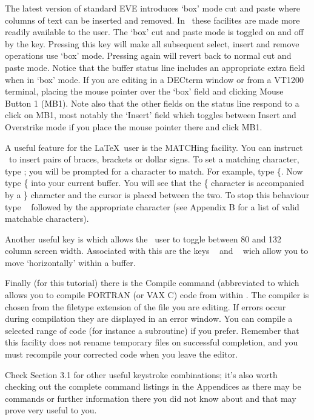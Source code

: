 The latest version of standard EVE introduces `box' mode cut and paste where
columns of text can be inserted and removed. In \STEve\ these facilites are
made more readily available to the user. The `box' cut and paste mode is
toggled on and off by the  key. Pressing this key will make all
subsequent select, insert and remove operations use `box' mode. Pressing
 again will revert back to normal cut and paste mode. Notice that
the buffer status line includes an appropriate extra field when in `box' mode.
If you are editing in a DECterm window or from a VT1200 terminal, placing the
mouse pointer over the `box' field and clicking Mouse Button 1 (MB1). Note also
that the other fields on the status line respond to a click on MB1, most
notably the `Insert' field which toggles between Insert and Overstrike mode if
you place the mouse pointer there and click MB1.

A useful feature for the \LaTeX\ user is the MATCHing facility. You can
instruct \STEve\ to insert pairs of braces, brackets or dollar signs. To set a
matching character, type ; you will be prompted for a character to
match. For example, type \{. Now type \{ into your current buffer. You will see
that the \{ character is accompanied by a \} character and the cursor is placed
between the two. To stop this behaviour type \gold\  followed by
the appropriate character (see Appendix B for a list of valid matchable
characters).

Another useful key is  which allows the \STEve\ user to toggle
between 80 and 132 column screen width. Associated with this are the keys
\gold\ \keyname{$\rhd$} and \gold\ \keyname{$\lhd$} wich allow you to move
`horizontally' within a buffer.

Finally (for this tutorial) there is the Compile command (abbreviated to 
  which allows you to compile FORTRAN (or VAX C) code
from within \STEve. The compiler is chosen from the filetype extension of the
file you are editing. If errors occur during compilation they are displayed in
an error window. You can compile a selected range of code (for instance a
subroutine) if you prefer. Remember that this facility does not rename
temporary files on successful completion, and you must recompile your corrected
code when you leave the editor. 

Check Section 3.1 for other useful keystroke combinations; it's also worth
checking out the complete command listings in the Appendices as there may be
commands or further information there you did not know about and that may prove
very useful to you.

